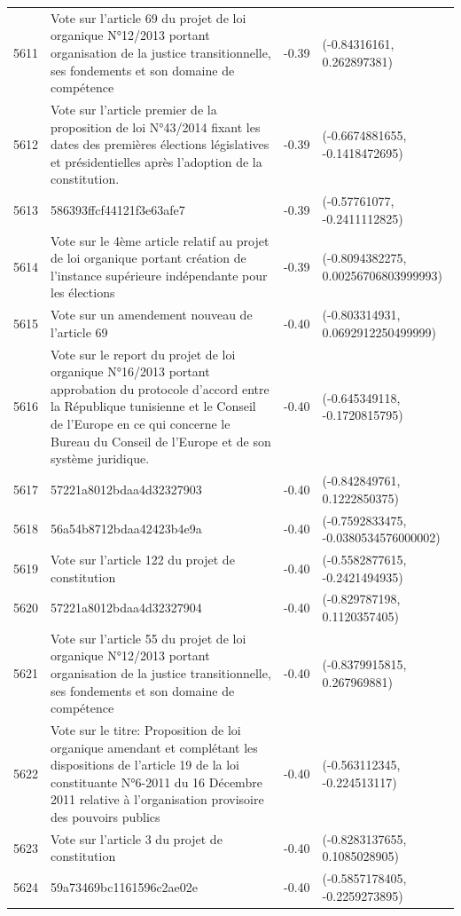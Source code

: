 \begin{table}[ht]
\begin{tabular}{rlrl}
  5611 & Vote sur l'article 69 du projet de loi organique N°12/2013 portant organisation de la justice transitionnelle, ses fondements et son domaine de compétence & -0.39 & (-0.84316161, 0.262897381) \\ 
  5612 & Vote sur l'article premier de la proposition de loi N°43/2014 fixant les dates des premières élections législatives et présidentielles après l'adoption de la constitution. & -0.39 & (-0.6674881655, -0.1418472695) \\ 
  5613 & 586393ffcf44121f3e63afe7 & -0.39 & (-0.57761077, -0.2411112825) \\ 
  5614 & Vote sur le 4ème article relatif au projet de loi organique portant création de l'instance supérieure indépendante pour les élections & -0.39 & (-0.8094382275, 0.00256706803999993) \\ 
  5615 & Vote sur un amendement nouveau de l'article 69 & -0.40 & (-0.803314931, 0.0692912250499999) \\ 
  5616 & Vote sur le report du projet de loi organique N°16/2013 portant approbation du protocole d'accord entre la République tunisienne et le Conseil de l'Europe en ce qui concerne le Bureau du Conseil de l'Europe et de son système juridique. & -0.40 & (-0.645349118, -0.1720815795) \\ 
  5617 & 57221a8012bdaa4d32327903 & -0.40 & (-0.842849761, 0.1222850375) \\ 
  5618 & 56a54b8712bdaa42423b4e9a & -0.40 & (-0.7592833475, -0.0380534576000002) \\ 
  5619 & Vote sur l'article 122 du projet de constitution & -0.40 & (-0.5582877615, -0.2421494935) \\ 
  5620 & 57221a8012bdaa4d32327904 & -0.40 & (-0.829787198, 0.1120357405) \\ 
  5621 & Vote sur l'article 55 du projet de loi organique N°12/2013 portant organisation de la justice transitionnelle, ses fondements et son domaine de compétence & -0.40 & (-0.8379915815, 0.267969881) \\ 
  5622 & Vote sur le titre: Proposition de loi organique amendant et complétant les dispositions de l'article 19 de la loi constituante N°6-2011 du 16 Décembre 2011 relative à l'organisation provisoire des pouvoirs publics & -0.40 & (-0.563112345, -0.224513117) \\ 
  5623 & Vote sur l'article 3 du projet de constitution & -0.40 & (-0.8283137655, 0.1085028905) \\ 
  5624 & 59a73469bc1161596c2ae02e & -0.40 & (-0.5857178405, -0.2259273895) \\ 

\end{tabular}
\end{table}

